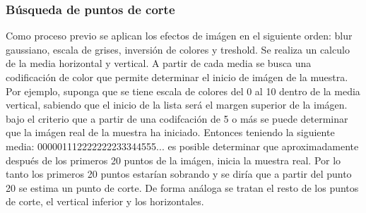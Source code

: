 \subsubsection{B\'usqueda de puntos de corte}
Como proceso previo se aplican los efectos de im\'agen en el siguiente orden: blur gaussiano, escala de grises, inversi\'on de colores y treshold. Se realiza un calculo de la media horizontal y vertical. A partir de cada media se busca una codificaci\'on de color que permite determinar el inicio de im\'agen de la muestra. Por ejemplo, suponga que se tiene escala de colores del 0 al 10 dentro de la media vertical, sabiendo que el inicio de la lista ser\'a el margen superior de la im\'agen. bajo el criterio que a partir de una codifcaci\'on de 5 o m\'as se puede determinar que la im\'agen real de la muestra ha iniciado. Entonces teniendo la siguiente media: 000001112222222233344555... es posible determinar que aproximadamente despu\'es de los primeros 20 puntos de la im\'agen, inicia la muestra real. Por lo tanto los primeros 20 puntos estar\'ian sobrando y se dir\'ia que a partir del punto 20 se estima un punto de corte. De forma an\'aloga se tratan el resto de los puntos de corte, el vertical inferior y los horizontales.

